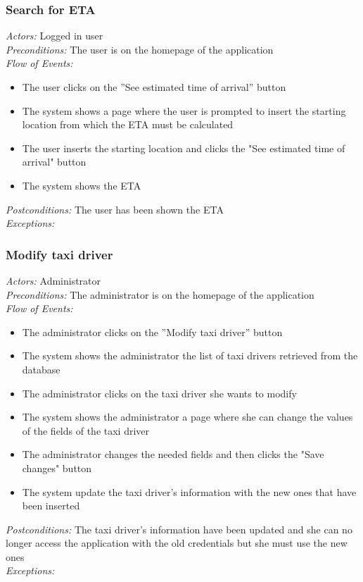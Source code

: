 \documentclass{article}
\begin{document}
	\subsubsection{Search for ETA}
	\textit{Actors:} Logged in user
	\\\textit{Preconditions:} The user is on the homepage of the application
	\\\textit{Flow of Events:}
	\begin{itemize}
		\item  The user clicks on the ''See estimated time of arrival'' button
		\item  The system shows a page where the user is prompted to insert the starting location from which the ETA must be calculated
		\item  The user inserts the starting location and clicks the "See estimated time of arrival" button
		\item  The system shows the ETA 
	\end{itemize}
	\textit{Postconditions:} The user has been shown the ETA
	\\\textit{Exceptions:}
	
	\subsubsection{Modify taxi driver}%
	\textit{Actors:} Administrator
	\\\textit{Preconditions:} The administrator is on the homepage of the application
	\\\textit{Flow of Events:}
	\begin{itemize}
		\item  The administrator clicks on the ''Modify taxi driver'' button
		\item  The system shows the administrator the list of taxi drivers retrieved from the database
		\item  The administrator clicks on the taxi driver she wants to modify
		\item  The system shows the administrator a page where she can change the values of the fields of the taxi driver
		\item  The administrator changes the needed fields and then clicks the "Save changes" button
		\item  The system update the taxi driver's information with the new ones that have been inserted
	\end{itemize}
	\textit{Postconditions:} The taxi driver's information have been updated and she can no longer access the application with the old credentials but she must use the new ones
	\\\textit{Exceptions:} %
	
\end{document}
